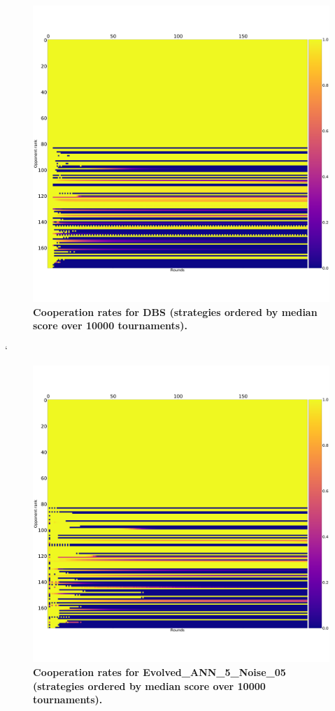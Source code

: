 \documentclass[10pt,letterpaper]{article}
\begin{document}
\begin{figure}[!hbtp]
        \centering
        \includegraphics[width=.7\textwidth]{cooperation_0_0_10000_DBS_0-75_3_4_3_5_array.pdf}
        \caption{\bf Cooperation rates for DBS
            (strategies ordered by median score over 10000 tournaments).}
        \label{fig:comparison_cooperation_heatmaps_noisy_1}
\end{figure}
        `
\begin{figure}[!hbtp]
        \centering
        \includegraphics[width=.7\textwidth]{cooperation_0_0_10000_Evolved_ANN_5_Noise_05_array.pdf}
        \caption{\bf Cooperation rates for Evolved\_ANN\_5\_Noise\_05
            (strategies ordered by median score over 10000 tournaments).}
        \label{fig:comparison_cooperation_heatmaps_noisy_2}
\end{figure}
\end{document}

